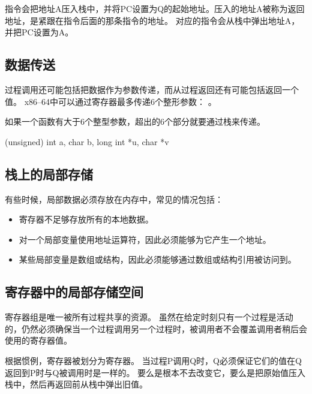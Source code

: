 {{        指令会把地址A压入栈中，并将PC设置为Q的起始地址。压入的地址A被称为返回地址，是紧跟在指令后面的那条指令的地址。
        对应的指令会从栈中弹出地址A，并把PC设置为A。

        \begin{practicec}

        \end{practicec}
    }

    \subsection{数据传送}
    {
        过程调用还可能包括把数据作为参数传递，而从过程返回还有可能包括返回一个值。
        x86--64中可以通过寄存器最多传递6个整形参数：
        。

        如果一个函数有大于6个整型参数，超出的6个部分就要通过栈来传递。

        \begin{practicec}
            (unsigned) int a, char b, long int *u, char *v
        \end{practicec}
    }

    \subsection{栈上的局部存储}
    {
        有些时候，局部数据必须存放在内存中，常见的情况包括：

        \begin{itemize}
            \item 寄存器不足够存放所有的本地数据。
            \item 对一个局部变量使用地址运算符，因此必须能够为它产生一个地址。
            \item 某些局部变量是数组或结构，因此必须能够通过数组或结构引用被访问到。
        \end{itemize}
    }

    \subsection{寄存器中的局部存储空间}
    {
        寄存器组是唯一被所有过程共享的资源。
        虽然在给定时刻只有一个过程是活动的，仍然必须确保当一个过程调用另一个过程时，被调用者不会覆盖调用者稍后会使用的寄存器值。

        根据惯例，寄存器被划分为寄存器。
        当过程P调用Q时，Q必须保证它们的值在Q返回到P时与Q被调用时是一样的。
        要么是根本不去改变它，要么是把原始值压入栈中，然后再返回前从栈中弹出旧值。

}}
